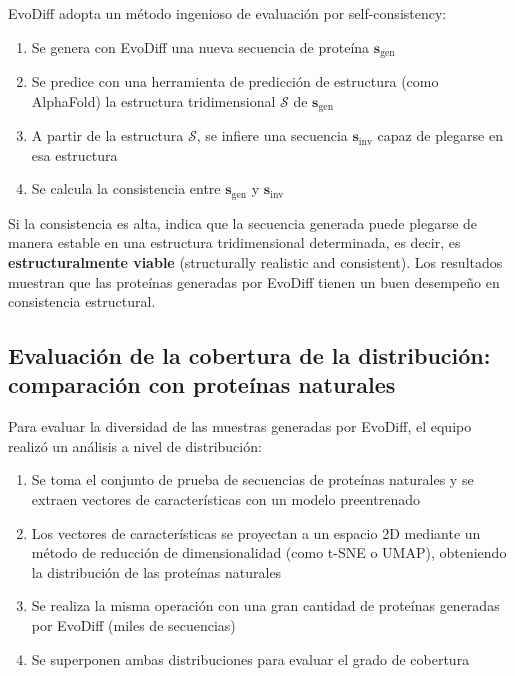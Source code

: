 EvoDiff adopta un método ingenioso de evaluación por self-consistency:

\begin{enumerate}
    \item Se genera con EvoDiff una nueva secuencia de proteína $\mathbf{s}_{\text{gen}}$
    \item Se predice con una herramienta de predicción de estructura (como AlphaFold) la estructura tridimensional $\mathcal{S}$ de $\mathbf{s}_{\text{gen}}$
    \item A partir de la estructura $\mathcal{S}$, se infiere una secuencia $\mathbf{s}_{\text{inv}}$ capaz de plegarse en esa estructura
    \item Se calcula la consistencia entre $\mathbf{s}_{\text{gen}}$ y $\mathbf{s}_{\text{inv}}$
\end{enumerate}

Si la consistencia es alta, indica que la secuencia generada puede plegarse de manera estable en una estructura tridimensional determinada, es decir, es \textbf{estructuralmente viable} (structurally realistic and consistent). Los resultados muestran que las proteínas generadas por EvoDiff tienen un buen desempeño en consistencia estructural.

\subsection{Evaluación de la cobertura de la distribución: comparación con proteínas naturales}

Para evaluar la diversidad de las muestras generadas por EvoDiff, el equipo realizó un análisis a nivel de distribución:

\begin{enumerate}
    \item Se toma el conjunto de prueba de secuencias de proteínas naturales y se extraen vectores de características con un modelo preentrenado
    \item Los vectores de características se proyectan a un espacio 2D mediante un método de reducción de dimensionalidad (como t-SNE o UMAP), obteniendo la distribución de las proteínas naturales
    \item Se realiza la misma operación con una gran cantidad de proteínas generadas por EvoDiff (miles de secuencias)
    \item Se superponen ambas distribuciones para evaluar el grado de cobertura
\end{enumerate}

